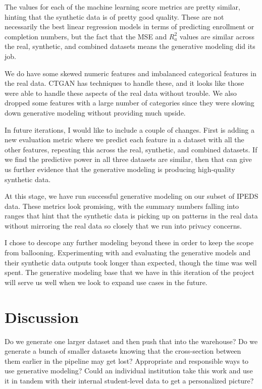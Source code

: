 \documentclass[sigconf, authorversion, nonacm]{acmart}
\begin{document}
    The values for each of the machine learning score metrics are pretty similar, hinting that the synthetic data is of pretty good quality. These are not necessarily the best linear regression models in terms of predicting enrollment or completion numbers, but the fact that the MSE and $R^2_a$ values are similar across the real, synthetic, and combined datasets means the generative modeling did its job.

    We do have some skewed numeric features and imbalanced categorical features in the real data. CTGAN has techniques to handle these, and it looks like those were able to handle these aspects of the real data without trouble. We also dropped some features with a large number of categories since they were slowing down generative modeling without providing much upside.

    In future iterations, I would like to include a couple of changes. First is adding a new evaluation metric where we predict each feature in a dataset with all the other features, repeating this across the real, synthetic, and combined datasets. If we find the predictive power in all three datasets are similar, then that can give us further evidence that the generative modeling is producing high-quality synthetic data.

    At this stage, we have run successful generative modeling on our subset of IPEDS data. These metrics look promising, with the summary numbers falling into ranges that hint that the synthetic data is picking up on patterns in the real data without mirroring the real data so closely that we run into privacy concerns.

    I chose to descope any further modeling beyond these in order to keep the scope from ballooning. Experimenting with and evaluating the generative models and their synthetic data outputs took longer than expected, though the time was well spent. The generative modeling base that we have in this iteration of the project will serve us well when we look to expand use cases in the future.

\section{Discussion}


    Do we generate one larger dataset and then push that into the warehouse? Do we generate a bunch of smaller datasets knowing that the cross-section between them earlier in the pipeline may get lost?
    Appropriate and responsible ways to use generative modeling?
    Could an individual institution take this work and use it in tandem with their internal student-level data to get a personalized picture?
\end{document}
